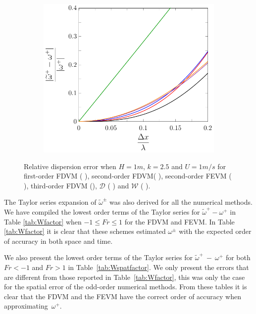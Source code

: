 \begin{figure}
\begin{subfigure}{0.5\textwidth}
	\end{subfigure}
	\par\bigskip
	\begin{subfigure}{0.5\textwidth}
		\includegraphics[width=\textwidth]{./chp4/figures/New/Dispu1Fill.pdf}
	\end{subfigure}
	\caption{Relative dispersion error when $H = 1m$, $k = 2.5$ and $U = 1m/s$ for first-order FDVM ({\color{green!60!black} \solidrule}), second-order FDVM({\color{red} \solidrule}), second-order FEVM ({\color{blue} \solidrule}), third-order FDVM ({\solidrule}), $\mathcal{D}$ ({\color{violet!80!white} \solidrule}) and $\mathcal{W}$ ({\color{orange} \solidrule}).}
	\label{fig:Dispu1Fill}
\end{figure}


The Taylor series expansion of $\widetilde{\omega}^\pm$ was also derived for all the numerical methods. We have compiled the lowest order terms of the Taylor series for $\widetilde{\omega}^+-\omega^+$ in Table \ref{tab:Wfactor} when $ -1 \le Fr \le 1$ for the FDVM and FEVM. In Table \ref{tab:Wfactor} it is clear that these schemes estimated $\omega^\pm$ with the expected order of accuracy in both space and time.

We also present the lowest order terms of the Taylor series for $\widetilde{\omega}^+~-~\omega^+$ for both $ Fr < -1$ and $ Fr > 1$ in Table~\ref{tab:Wspatfactor}. We only present the errors that are different from those reported in Table~\ref{tab:Wfactor}, this was only the case for the spatial error of the odd-order numerical methods.  From these tables it is clear that the FDVM and the FEVM have the correct order of accuracy when approximating~$\omega^+$. 

